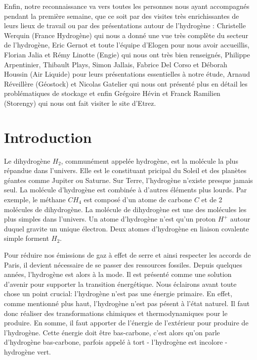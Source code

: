 \documentclass[11pt,french,a4paper]{article}
\makeatletter
\newcommand\mainmatter{%

  \pagenumbering{arabic}}
\makeatother
\begin{document}
Enfin, notre reconnaissance va vers toutes les personnes nous ayant accompagnés pendant la première semaine, que ce soit par des visites très enrichissantes de leurs lieux de travail ou par des présentations autour de l’hydrogène : Christelle Werquin (France Hydrogène) qui nous a donné une vue très complète du secteur de l’hydrogène, Eric Gernot et toute l'équipe d'Elogen pour nous avoir accueillis, Florian Jalia et Rémy Linotte (Engie) qui nous ont très bien renseignés, Philippe Arpentinier, Thibault Plays, Simon Jallais, Fabrice Del Corso et Déborah Houssin (Air Liquide) pour leurs présentations essentielles à notre étude,  Arnaud Réveillère (Géostock) et Nicolas Gatelier qui nous ont présenté plus en détail les problématiques de stockage et enfin Grégoire Hévin et Franck Ramilien (Storengy) qui nous ont fait visiter le site d’Etrez.






\newpage
\tableofcontents

\newpage
















\mainmatter

\section*{Introduction} 

Le dihydrogène $H_2$, communément appelée hydrogène, est la molécule la plus répandue dans l'univers. Elle est le constituant pricipal du Soleil et des planètes géantes comme Jupiter ou Saturne. Sur Terre, l'hydrogène n'existe presque jamais seul. La molécule d'hydrogène est combinée à d'autres éléments plus lourds. Par exemple, le méthane $CH_4$ est composé d'un atome de carbone $C$ et de 2 molécules de dihydrogène. La molécule de dihydrogène est une des molécules les plus simples dans l'univers. Un atome d'hydrogène n'est qu'un proton $H^+$ autour duquel gravite un unique électron. Deux atomes d'hydrogène en liaison covalente simple forment $H_2$.

Pour réduire nos émissions de gaz à effet de serre et ainsi respecter les accords de Paris, il devient nécessaire de se passer des ressources fossiles. Depuis quelques années, l'hydrogène est alors à la mode. Il est présenté comme une solution d'avenir pour supporter la transition énergétique. Nous éclairons avant toute chose un point crucial: l'hydrogène n'est pas une énergie primaire. En effet, comme mentionné plus haut, l'hydrogène n'est pas pésent à l'état naturel. Il faut donc réaliser des transformations chimiques et thermodynamiques pour le produire. En somme, il faut apporter de l'énergie de l'extérieur pour produire de l'hydrogène. Cette énergie doit être bas-carbone, c'est alors qu'on parle d'hydrogène bas-carbone, parfois appelé à tort - l'hydrogène est incolore - hydrogène vert.
\end{document}
